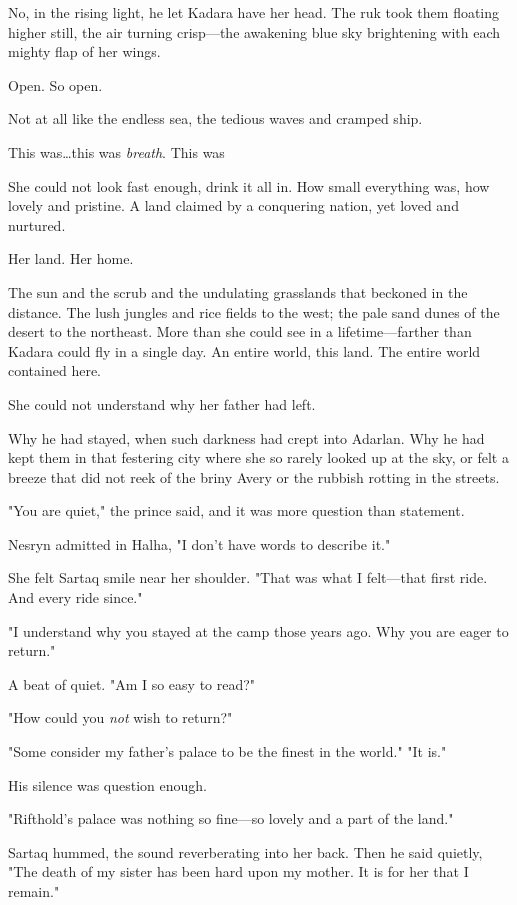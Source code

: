 No, in the rising light, he let Kadara have her head.
The ruk took them floating higher still, the air turning crisp---the awakening blue sky brightening with each mighty flap of her wings.

Open.
So open.

Not at all like the endless sea, the tedious waves and cramped ship.

This was\ldots this was \emph{breath}.
This was 

She could not look fast enough, drink it all in.
How small everything was, how lovely and pristine.
A land claimed by a conquering nation, yet loved and nurtured.

Her land.
Her home.

The sun and the scrub and the undulating grasslands that beckoned in the distance.
The lush jungles and rice fields to the west; the pale sand dunes of the desert to the northeast.
More than she could see in a lifetime---farther than Kadara could fly in a single day.
An entire world, this land.
The entire world contained here.

She could not understand why her father had left.

Why he had stayed, when such darkness had crept into Adarlan.
Why he had kept them in that festering city where she so rarely looked up at the sky, or felt a breeze that did not reek of the briny Avery or the rubbish rotting in the streets.

"You are quiet," the prince said, and it was more question than statement.

Nesryn admitted in Halha, "I don't have words to describe it."

She felt Sartaq smile near her shoulder.
"That was what I felt---that first ride.
And every ride since."

"I understand why you stayed at the camp those years ago.
Why you are eager to return."

A beat of quiet.
"Am I so easy to read?"

"How could you \emph{not} wish to return?"

"Some consider my father's palace to be the finest in the world."
"It is."

His silence was question enough.

"Rifthold's palace was nothing so fine---so lovely and a part of the land."

Sartaq hummed, the sound reverberating into her back.
Then he said quietly, "The death of my sister has been hard upon my mother.
It is for her that I remain."

